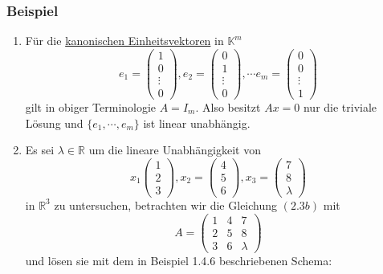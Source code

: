 \subsubsection{Beispiel}
\renewcommand{\labelenumi}{(\arabic{enumi})}
\begin{enumerate}
\item Für die \underline{kanonischen Einheitsvektoren} in $\mathbb{K}^m$
\[ e_1=\begin{pmatrix}1\\ 0 \\ \vdots \\ 0\end{pmatrix},e_2=\begin{pmatrix}0\\ 1 \\ \vdots \\ 0\end{pmatrix}, \cdots e_m=\begin{pmatrix}0 \\ 0 \\ \vdots \\ 1\end{pmatrix}\]
gilt in obiger Terminologie $A=I_m$.  Also besitzt $Ax=0$ nur die triviale Lösung und $\{e_1,\cdots ,e_m\}$ ist linear unabhängig.
\item Es sei $\lambda \in \mathbb{R}$ um die lineare Unabhängigkeit von 
\[x_1\begin{pmatrix}1\\ 2\\ 3\end{pmatrix}, x_2=\begin{pmatrix}4\\ 5\\ 6\end{pmatrix}, x_3=\begin{pmatrix}7\\ 8\\ \lambda \end{pmatrix}\]
in $\mathbb{R}^3$ zu untersuchen, betrachten wir die Gleichung $(2.3b)$ mit
\[A=\begin{pmatrix}1 & 4 & 7\\2 & 5 & 8\\ 3 & 6 & \lambda\end{pmatrix}\]
und lösen sie mit dem in Beispiel 1.4.6 beschriebenen Schema:

\end{enumerate}
